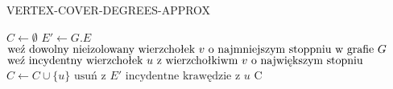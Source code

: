 \begin{algorithm}
\caption{VERTEX-COVER-DEGREES-APPROX}\label{euclid}
\begin{algorithmic}[1]
\State $C \gets \emptyset$
\State $E' \gets G.E$
\State $\text{weź dowolny nieizolowany wierzchołek }v \newline \text{ o najmniejszym  stoppniu w grafie }G$
\State $\text{weź incydentny wierzchołek }u\text{ z wierzchołkiwm }v \newline \text{ o największym stopniu}$
\State $C \gets C \cup \{u\}$
\State $\text{usuń z } E' \text{ incydentne krawędzie z } u$
\EndWhile
\State \Return C
\EndFunction
\end{algorithmic}
\end{algorithm}
